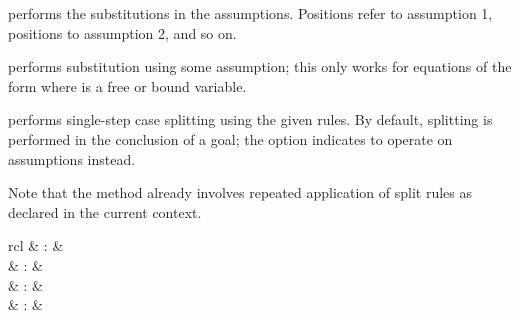 \begin{isabellebody}
\begin{isamarkuptext}
\begin{descr}
  \item [\hyperlink{method.subst}{\mbox{\isa{subst}}}~\isa{{\isachardoublequote}{\isacharparenleft}asm{\isacharparenright}\ {\isacharparenleft}i\ {\isasymdots}\ j{\isacharparenright}\ eq{\isachardoublequote}}] performs the
  substitutions in the assumptions.  Positions 
  refer to assumption 1, positions 
  to assumption 2, and so on.

  \item [\hyperlink{method.hypsubst}{\mbox{\isa{hypsubst}}}] performs substitution using some
  assumption; this only works for equations of the form  where  is a free or bound variable.

  \item [\hyperlink{method.split}{\mbox{\isa{split}}}~\isa{{\isachardoublequote}a\isactrlsub {\isadigit{1}}\ {\isasymdots}\ a\isactrlsub n{\isachardoublequote}}] performs
  single-step case splitting using the given rules.  By default,
  splitting is performed in the conclusion of a goal; the  option indicates to operate on assumptions instead.
  
  Note that the \hyperlink{method.simp}{\mbox{}} method already involves repeated
  application of split rules as declared in the current context.

  \end{descr}%
\end{isamarkuptext}%
\isamarkuptrue%
%
\isamarkuptrue%
%
\isamarkuptrue%
%
\begin{isamarkuptext}%
\begin{matharray}{rcl}
    \hypertarget{method.rule}{\hyperlink{method.rule}{\mbox{}}} & : & \isarmeth \\
    \hypertarget{method.contradiction}{\hyperlink{method.contradiction}{\mbox{}}} & : & \isarmeth \\
    \hypertarget{method.intro}{\hyperlink{method.intro}{\mbox{}}} & : & \isarmeth \\
    \hypertarget{method.elim}{\hyperlink{method.elim}{\mbox{}}} & : & \isarmeth \\
  \end{matharray}


\end{isamarkuptext}
\end{isabellebody}
